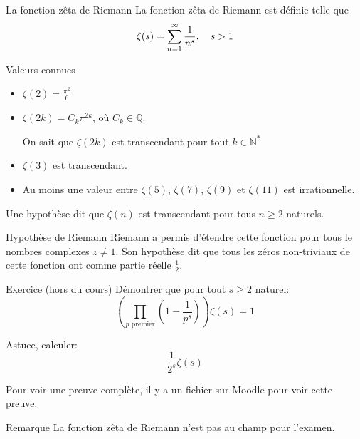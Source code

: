 \documentclass[a4paper]{article}
\begin{document}
\begin{parag}{La fonction zêta de Riemann}
    La fonction zêta de Riemann est définie telle que
    \[\zeta\left(s\right) = \sum_{n=1}^{\infty} \frac{1}{n^{s}}, \mathspace s > 1\]

    \begin{subparag}{Valeurs connues}
        \begin{itemize}[left=0pt]
            \item $\zeta\left(2\right) = \frac{\pi^2}{6}$
            \item $\zeta\left(2k\right) = C_k \pi^{2k}$, où $C_k \in \mathbb{Q}$.

                On sait que $\zeta\left(2k\right)$ est transcendant pour tout $k \in \mathbb{N}^*$

            \item $\zeta\left(3\right)$ est transcendant.
            \item Au moins une valeur entre $\zeta\left(5\right)$, $\zeta\left(7\right)$, $\zeta\left(9\right)$ et $\zeta\left(11\right)$ est irrationnelle.
        \end{itemize}

        Une hypothèse dit que $\zeta\left(n\right)$ est transcendant pour tous $n \geq 2$ naturels.
    \end{subparag}

    \begin{subparag}{Hypothèse de Riemann}
        Riemann a permis d'étendre cette fonction pour tous le nombres complexes $z \neq 1$. Son hypothèse dit que tous les zéros non-triviaux de cette fonction ont comme partie réelle $\frac{1}{2}$.
    \end{subparag}

    \begin{subparag}{Exercice (hors du cours)}
        Démontrer que pour tout $s \geq 2$ naturel:
        \[\left(\prod_{p \text{ premier}}^{} \left(1 - \frac{1}{p^{s}}\right)\right)\zeta\left(s\right) = 1\]

        Astuce, calculer:
        \[\frac{1}{2^{s}}\zeta\left(s\right)\]

        Pour voir une preuve complète, il y a un fichier sur Moodle pour voir cette preuve.

    \end{subparag}

    \begin{subparag}{Remarque}
        La fonction zêta de Riemann n'est pas au champ pour l'examen.
    \end{subparag}
\end{parag}
\end{document}
